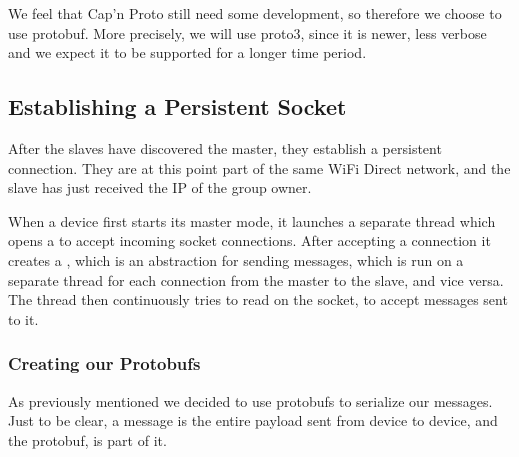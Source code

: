 We feel that Cap'n Proto still need some development, so therefore we choose to use protobuf. 
More precisely, we will use proto3, since it is newer, less verbose and we expect it to be supported for a longer time period.

\subsection{Establishing a Persistent Socket}

After the slaves have discovered the master, they establish a persistent connection.
They are at this point part of the same WiFi Direct network, and the slave has just received the IP of the group owner.

When a device first starts its master mode, it launches a separate thread which opens a  to accept incoming socket connections.
After accepting a connection it creates a , which is an abstraction for sending messages, which is run on a separate thread for each connection from the master to the slave, and vice versa.
The thread then continuously tries to read on the socket, to accept messages sent to it.

\subsubsection*{Creating our Protobufs}
As previously mentioned we decided to use protobufs to serialize our messages.
Just to be clear, a message is the entire payload sent from device to device, and the protobuf, is part of it.

